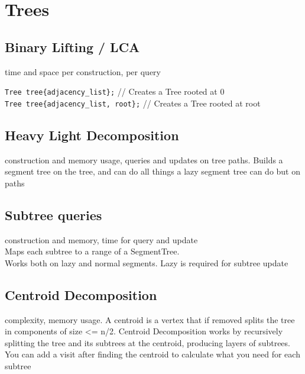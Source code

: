 \section{Trees}

\subsection{Binary Lifting / LCA}
 time and space per construction,  per query

\verb|Tree tree{adjacency_list};| // Creates a Tree rooted at 0 \\
\verb|Tree tree{adjacency_list, root};| // Creates a Tree rooted at root

\subsection{Heavy Light Decomposition}
 construction and memory usage,  queries and updates on tree paths.
Builds a segment tree on the tree, and can do all things a lazy segment tree can do but on paths

\subsection{Subtree queries}
 construction and memory,  time for query and update \\
Maps each subtree to a range of a SegmentTree.\\
Works both on lazy and normal segments. Lazy is required for subtree update


\subsection{Centroid Decomposition}
 complexity,  memory usage.
A centroid is a vertex that if removed splits the tree in components of size <= n/2.
Centroid Decomposition works by recursively splitting the tree and its subtrees
at the centroid, producing  layers of subtrees.
You can add a visit after finding the centroid to calculate what you need for each subtree


